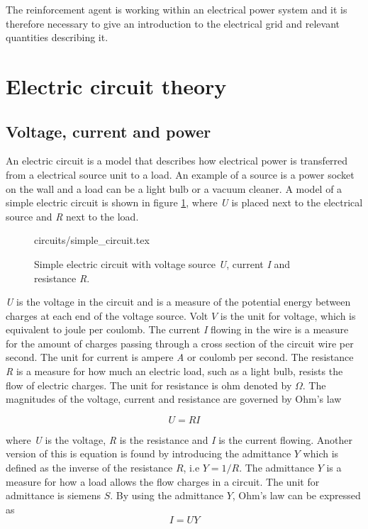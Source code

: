 \documentclass[class=book, crop=false]{standalone}
\begin{document}
The reinforcement agent is working within an electrical power system and it is therefore necessary to give an introduction to the electrical grid and relevant quantities describing it. 

\section{Electric circuit theory}
\subsection{Voltage, current and power}
An electric circuit is a model that describes how electrical power is transferred from a electrical source unit to a load. An example of a source is a power socket on the wall and a load can be a light bulb or a vacuum cleaner. A model of a simple electric circuit is shown in figure \ref{fig:theory:simple_circuit}, where \textit{U} is placed next to the electrical source and \textit{R} next to the load. 

\begin{figure}[ht!]
    \centering
    {circuits/simple_circuit.tex}
    \caption{Simple electric circuit with voltage source \textit{U}, current \textit{I} and resistance \textit{R}.}
    \label{fig:theory:simple_circuit}
\end{figure}



\textit{U} is the voltage in the circuit and is a measure of the potential energy between charges at each end of the voltage source. Volt $V$ is the unit for voltage, which is equivalent to joule per coulomb. The current \textit{I} flowing in the wire is a measure for the amount of charges passing through a cross section of the circuit wire per second. The unit for current is ampere \textit{A} or coulomb per second. The resistance \textit{R} is a measure for how much an electric load, such as a light bulb, resists the flow of electric charges. The unit for resistance is ohm denoted by $\Omega$. The magnitudes of the voltage, current and resistance are governed by Ohm's law

\begin{equation}\label{eq:theory:ohm_simple}
    U = RI
\end{equation}

where  \textit{U} is the voltage, \textit{R} is the resistance and \textit{I} is the current flowing. Another version of this is equation is found by introducing the admittance $Y$ which is defined as the inverse of the resistance $R$, i.e  $Y = 1/R$. The admittance $Y$ is a measure for how a load allows the flow charges in a circuit. The unit for admittance is siemens $S$. By using the admittance $Y$, Ohm's law can be expressed as
\begin{equation}\label{eq:theory:ohm_simple_inverse}
    I = UY
\end{equation}
\end{document}
